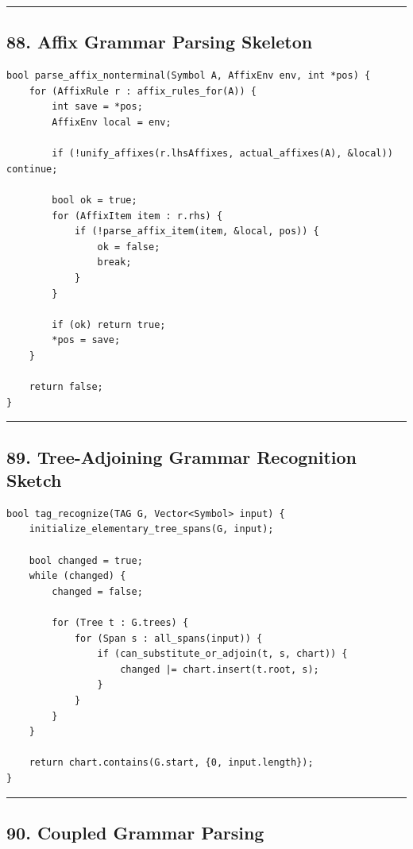 \documentclass[10pt,letterpaper]{article}
\begin{document}
\medskip\hrule\medskip

\subsection*{88. Affix Grammar Parsing Skeleton}

\begin{verbatim}
bool parse_affix_nonterminal(Symbol A, AffixEnv env, int *pos) {
    for (AffixRule r : affix_rules_for(A)) {
        int save = *pos;
        AffixEnv local = env;

        if (!unify_affixes(r.lhsAffixes, actual_affixes(A), &local)) continue;

        bool ok = true;
        for (AffixItem item : r.rhs) {
            if (!parse_affix_item(item, &local, pos)) {
                ok = false;
                break;
            }
        }

        if (ok) return true;
        *pos = save;
    }

    return false;
}
\end{verbatim}

\medskip\hrule\medskip

\subsection*{89. Tree-Adjoining Grammar Recognition Sketch}

\begin{verbatim}
bool tag_recognize(TAG G, Vector<Symbol> input) {
    initialize_elementary_tree_spans(G, input);

    bool changed = true;
    while (changed) {
        changed = false;

        for (Tree t : G.trees) {
            for (Span s : all_spans(input)) {
                if (can_substitute_or_adjoin(t, s, chart)) {
                    changed |= chart.insert(t.root, s);
                }
            }
        }
    }

    return chart.contains(G.start, {0, input.length});
}
\end{verbatim}

\medskip\hrule\medskip

\subsection*{90. Coupled Grammar Parsing}
\end{document}
